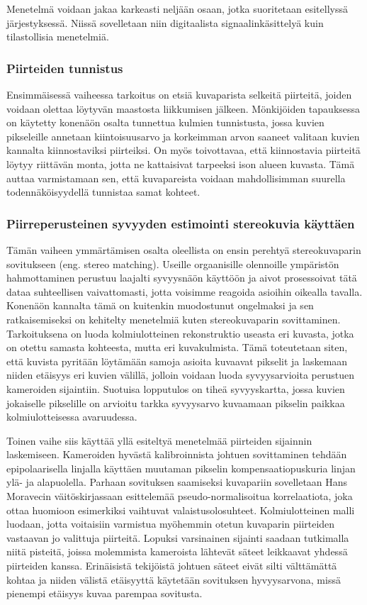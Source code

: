\documentclass[finnish]{tktltiki2}
\theoremstyle{definition}
\theoremstyle{remark}
\begin{document}
Menetelmä voidaan jakaa karkeasti neljään osaan, jotka suoritetaan esitellyssä järjestyksessä. Niissä sovelletaan niin digitaalista signaalinkäsittelyä kuin tilastollisia menetelmiä.

\subsubsection{Piirteiden tunnistus}
Ensimmäisessä vaiheessa tarkoitus on etsiä kuvaparista selkeitä piirteitä, joiden voidaan olettaa löytyvän maastosta liikkumisen jälkeen. Mönkijöiden tapauksessa on käytetty konenäön osalta tunnettua kulmien tunnistusta, jossa kuvien pikseleille annetaan kiintoisuusarvo ja korkeimman arvon saaneet valitaan kuvien kannalta kiinnostaviksi piirteiksi. On myös toivottavaa, että kiinnostavia piirteitä löytyy riittävän monta, jotta ne kattaisivat tarpeeksi ison alueen kuvasta. Tämä auttaa varmistamaan sen, että kuvapareista voidaan mahdollisimman suurella todennäköisyydellä tunnistaa samat kohteet.\cite{cheng2005visual}

\subsubsection{Piirreperusteinen syvyyden estimointi stereokuvia käyttäen}
Tämän vaiheen ymmärtämisen osalta oleellista on ensin perehtyä stereokuvaparin sovitukseen (eng. stereo matching). Useille orgaanisille olennoille ympäristön hahmottaminen perustuu laajalti syvyysnäön käyttöön ja aivot prosessoivat tätä dataa suhteellisen vaivattomasti, jotta voisimme reagoida asioihin oikealla tavalla. Konenäön kannalta tämä on kuitenkin muodostunut ongelmaksi ja sen ratkaisemiseksi on kehitelty menetelmiä kuten stereokuvaparin sovittaminen. Tarkoituksena on luoda kolmiulotteinen rekonstruktio useasta eri kuvasta, jotka on otettu samasta kohteesta, mutta eri kuvakulmista. Tämä toteutetaan siten, että kuvista pyritään löytämään samoja asioita kuvaavat pikselit ja laskemaan niiden etäisyys eri kuvien välillä, jolloin voidaan luoda syvyysarvioita perustuen kameroiden sijaintiin. Suotuisa lopputulos on tiheä syvyyskartta, jossa kuvien jokaiselle pikselille on arvioitu tarkka syvyysarvo kuvaamaan pikselin paikkaa kolmiulotteisessa avaruudessa.\cite{hong2010study}

Toinen vaihe siis käyttää yllä esiteltyä menetelmää piirteiden sijainnin laskemiseen. Kameroiden hyvästä kalibroinnista johtuen sovittaminen tehdään epipolaarisella linjalla käyttäen muutaman pikselin kompensaatiopuskuria linjan ylä- ja alapuolella. Parhaan sovituksen saamiseksi kuvapariin sovelletaan Hans Moravecin väitöskirjassaan esittelemää pseudo-normalisoitua korrelaatiota, joka ottaa huomioon esimerkiksi vaihtuvat valaistusolosuhteet\cite{moravec1980obstacle}. Kolmiulotteinen malli luodaan, jotta voitaisiin varmistua myöhemmin otetun kuvaparin piirteiden vastaavan jo valittuja piirteitä. Lopuksi varsinainen sijainti saadaan tutkimalla niitä pisteitä, joissa molemmista kameroista lähtevät säteet leikkaavat yhdessä piirteiden kanssa. Erinäisistä tekijöistä johtuen säteet eivät silti välttämättä kohtaa ja niiden välistä etäisyyttä käytetään sovituksen hyvyysarvona, missä pienempi etäisyys kuvaa parempaa sovitusta.\cite{cheng2005visual}
\end{document}
